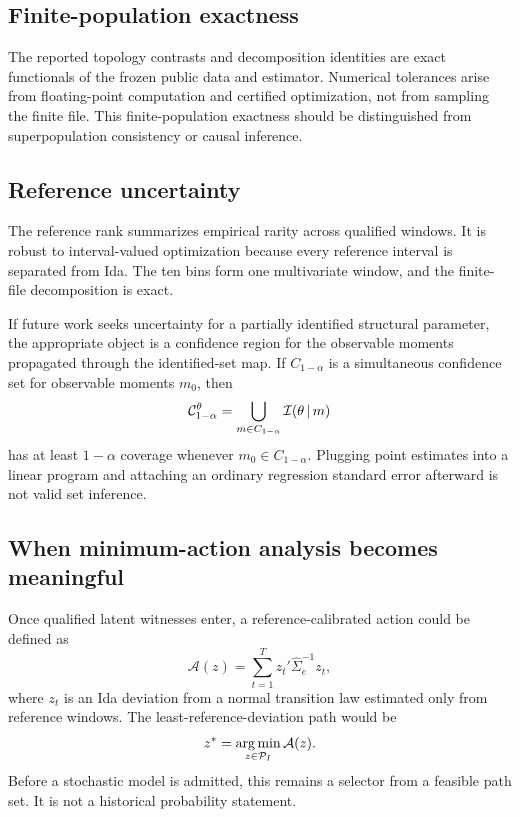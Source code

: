 \documentclass[11pt]{article}
\begin{document}
\subsection{Finite-population exactness}

The reported topology contrasts and decomposition identities are exact functionals of the frozen public data and estimator. Numerical tolerances arise from floating-point computation and certified optimization, not from sampling the finite file. This finite-population exactness should be distinguished from superpopulation consistency or causal inference.

\subsection{Reference uncertainty}

The reference rank summarizes empirical rarity across qualified windows. It is robust to interval-valued optimization because every reference interval is separated from Ida. The ten bins form one multivariate window, and the finite-file decomposition is exact.

If future work seeks uncertainty for a partially identified structural parameter, the appropriate object is a confidence region for the observable moments propagated through the identified-set map. If $C_{1-\alpha}$ is a simultaneous confidence set for observable moments $m_0$, then
\begin{equation}
\mathcal C^{\theta}_{1-\alpha}
=\bigcup_{m\in C_{1-\alpha}}\mathcal{I}(\theta\,|\, m)
\end{equation}
has at least $1-\alpha$ coverage whenever $m_0\in C_{1-\alpha}$. Plugging point estimates into a linear program and attaching an ordinary regression standard error afterward is not valid set inference.

\subsection{When minimum-action analysis becomes meaningful}

Once qualified latent witnesses enter, a reference-calibrated action could be defined as
\begin{equation}
\mathcal A(z)=\sum_{t=1}^{T}z_t'\widehat\Sigma_e^{-1}z_t,
\end{equation}
where $z_t$ is an Ida deviation from a normal transition law estimated only from reference windows. The least-reference-deviation path would be
\begin{equation}
z^*=\operatorname*{arg\,min}_{z\in\mathcal P_I}\mathcal A(z).
\end{equation}
Before a stochastic model is admitted, this remains a selector from a feasible path set. It is not a historical probability statement.
\end{document}
